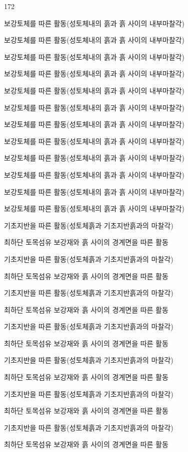 			\begin{dingautolist}{172}
			\setlength\itemsep{-1.0em}
			\setlength\leftmargin{8cm}
			\setlength\rightmargin{10cm}
			\item	보강토체를 따른 활동(성토체내의 흙과 흙 사이의 내부마찰각) 
			\item	보강토체를 따른 활동(성토체내의 흙과 흙 사이의 내부마찰각) 
			\item	보강토체를 따른 활동(성토체내의 흙과 흙 사이의 내부마찰각) 
			\item	보강토체를 따른 활동(성토체내의 흙과 흙 사이의 내부마찰각) 
			\item	보강토체를 따른 활동(성토체내의 흙과 흙 사이의 내부마찰각) 
			\item	보강토체를 따른 활동(성토체내의 흙과 흙 사이의 내부마찰각) 
			\item	보강토체를 따른 활동(성토체내의 흙과 흙 사이의 내부마찰각) 
			\item	보강토체를 따른 활동(성토체내의 흙과 흙 사이의 내부마찰각) 
			\item	보강토체를 따른 활동(성토체내의 흙과 흙 사이의 내부마찰각) 
			\item	보강토체를 따른 활동(성토체내의 흙과 흙 사이의 내부마찰각) 
			\item	보강토체를 따른 활동(성토체내의 흙과 흙 사이의 내부마찰각) 
			\item	보강토체를 따른 활동(성토체내의 흙과 흙 사이의 내부마찰각) 
			\item	기초지반을 따른 활동(성토체흙과 기초지반흙과의 마찰각) 
			\item	최하단 토목섬유 보강재와 흙 사이의 경계면을 따른 활동 
			\item	기초지반을 따른 활동(성토체흙과 기초지반흙과의 마찰각) 
			\item	최하단 토목섬유 보강재와 흙 사이의 경계면을 따른 활동 
			\item	기초지반을 따른 활동(성토체흙과 기초지반흙과의 마찰각) 
			\item	최하단 토목섬유 보강재와 흙 사이의 경계면을 따른 활동 
			\item	기초지반을 따른 활동(성토체흙과 기초지반흙과의 마찰각) 
			\item	최하단 토목섬유 보강재와 흙 사이의 경계면을 따른 활동 
			\item	기초지반을 따른 활동(성토체흙과 기초지반흙과의 마찰각) 
			\item	최하단 토목섬유 보강재와 흙 사이의 경계면을 따른 활동 
			\item	기초지반을 따른 활동(성토체흙과 기초지반흙과의 마찰각) 
			\item	최하단 토목섬유 보강재와 흙 사이의 경계면을 따른 활동 
			\item	기초지반을 따른 활동(성토체흙과 기초지반흙과의 마찰각) 
			\item	최하단 토목섬유 보강재와 흙 사이의 경계면을 따른 활동 
			\end{dingautolist}


